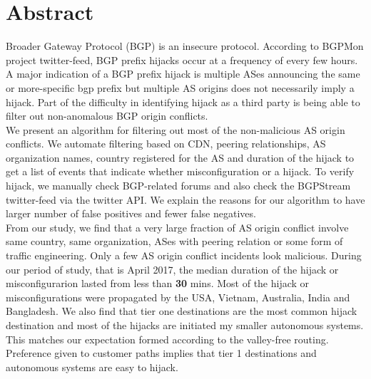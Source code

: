  \section{Abstract}\label{sec:abstract}
Broader Gateway Protocol (BGP) is an insecure protocol. According to BGPMon project twitter-feed, BGP prefix hijacks occur at a frequency of every few hours. A major indication of a BGP prefix hijack is multiple ASes announcing the same or more-specific bgp prefix but multiple AS origins does not necessarily imply a hijack. Part of the difficulty in identifying hijack as a third party is being able to filter out non-anomalous BGP origin conflicts.\\
We present an algorithm for filtering out most of the non-malicious AS origin conflicts. We automate filtering based on CDN, peering relationships, AS organization names, country registered for the AS and duration of the hijack to get a list of events that indicate whether misconfiguration or a hijack. To verify hijack, we manually check BGP-related forums and also check the BGPStream twitter-feed via the twitter API. We explain the reasons for our algorithm to have larger number of false positives and fewer false negatives. \\
From our study, we find that a very large fraction of AS origin conflict involve same country, same organization, ASes with peering relation or some form of traffic engineering. Only a few AS origin conflict incidents look malicious. During our period of study, that is April 2017, the median duration of the hijack or misconfigurarion lasted from less than \textbf{30 }mins. Most of the hijack or misconfigurations were propagated by the USA, Vietnam, Australia, India and Bangladesh. We also find that tier one destinations are the most common hijack destination and most of the hijacks are initiated my smaller autonomous systems. This matches our expectation formed according to the valley-free routing. Preference given to customer paths implies that tier 1 destinations and autonomous systems are easy to hijack.